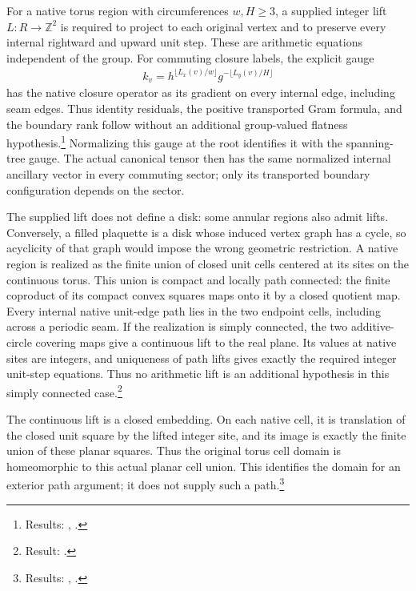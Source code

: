 \documentclass{article}
\begin{document}
For a native torus region with circumferences $w,H\geq3$, a supplied
integer lift $L:R\to\mathbb Z^2$ is required to project to each original
vertex and to preserve every internal rightward and upward unit step.
These are arithmetic equations independent of the group. For commuting
closure labels, the explicit gauge
\begin{align}
 k_v=h^{\lfloor L_x(v)/w\rfloor}
      g^{-\lfloor L_y(v)/H\rfloor}
    \label{eq:rmp_peps_qd_lift_gauge}
\end{align}
has the native closure operator as its gradient on every internal edge,
including seam edges. Thus identity residuals, the positive transported
Gram formula, and the boundary rank follow without an additional
group-valued flatness hypothesis.\footnote{Results:
    ,
    .}
Normalizing this gauge at the root
identifies it with the spanning-tree gauge. The actual canonical tensor
then has the same normalized internal ancillary vector in every commuting
sector; only its transported boundary configuration depends on the sector.

The supplied lift does not define a disk: some annular regions also
admit lifts. Conversely, a filled plaquette is a disk whose induced
vertex graph has a cycle, so acyclicity of that graph would impose the
wrong geometric restriction. A native region is realized as the finite
union of closed unit cells centered at its sites on the continuous torus.
This union is compact and locally path connected: the finite coproduct
of its compact convex squares maps onto it by a closed quotient map.
Every internal native unit-edge path lies in the two endpoint cells,
including across a periodic seam. If the realization is simply
connected, the two additive-circle covering maps give a continuous
lift to the real plane. Its values at native sites are integers, and
uniqueness of path lifts gives exactly the required integer unit-step
equations. Thus no arithmetic lift is an additional hypothesis in
this simply connected case.\footnote{Result:
    .}

The continuous lift is a closed embedding. On each native cell, it is
translation of the closed unit square by the lifted integer site, and
its image is exactly the finite union of these planar squares. Thus
the original torus cell domain is homeomorphic to this actual planar
cell union. This identifies the domain for an exterior path argument;
it does not supply such a path.\footnote{Results:
    ,
    .}
\end{document}

